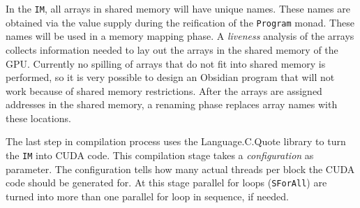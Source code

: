 



In the {\tt IM}, all arrays in shared memory will have unique 
names. These names are obtained via the value supply during the reification 
of the {\tt Program} monad. These names will be used in a memory mapping phase.
A {\em liveness} analysis of the arrays collects information needed to lay 
out the arrays in the shared memory of the GPU. Currently no spilling of 
arrays that do not fit into shared memory is performed, so it is very possible 
to design an Obsidian program that will not work because of shared memory 
restrictions. After the arrays are assigned addresses in the shared memory,
a renaming phase replaces array names with these locations. 

The last step in compilation process uses the Language.C.Quote library to 
turn the {\tt IM} into CUDA code. This compilation stage takes a {\em configuration} 
as parameter. The configuration tells how many actual threads per block the 
CUDA code should be generated for. At this stage parallel for loops ({\tt SForAll})
are turned into more than one parallel for loop in sequence, if needed. 


